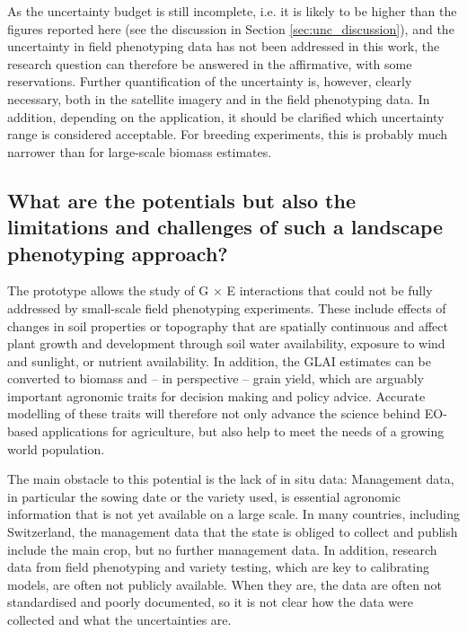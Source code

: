 As the uncertainty budget is still incomplete, i.e. it is likely to be higher than the figures reported here (see the discussion in Section \ref{sec:unc_discussion}), and the uncertainty in field phenotyping data has not been addressed in this work, the research question can therefore be answered in the affirmative, with some reservations. Further quantification of the uncertainty is, however, clearly necessary, both in the satellite imagery and in the field phenotyping data. In addition, depending on the application, it should be clarified which uncertainty range is considered acceptable. For breeding experiments, this is probably much narrower than for large-scale biomass estimates.

\subsection{What are the potentials but also the limitations and challenges of such a landscape phenotyping approach?}

The prototype allows the study of G $\times$ E interactions that could not be fully addressed by small-scale field phenotyping experiments. These include effects of changes in soil properties or topography that are spatially continuous and affect plant growth and development through soil water availability, exposure to wind and sunlight, or nutrient availability. In addition, the \gls{GLAI} estimates can be converted to biomass \citep{aase_relationship_1978} and -- in perspective -- grain yield, which are arguably important agronomic traits for decision making and policy advice. Accurate modelling of these traits will therefore not only advance the science behind \gls{EO}-based applications for agriculture, but also help to meet the needs of a growing world population.

The main obstacle to this potential is the lack of in situ data: Management data, in particular the sowing date or the variety used, is essential agronomic information that is not yet available on a large scale. In many countries, including Switzerland, the management data that the state is obliged to collect and publish include the main crop, but no further management data. In addition, research data from field phenotyping and variety testing, which are key to calibrating models, are often not publicly available. When they are, the data are often not standardised and poorly documented, so it is not clear how the data were collected and what the uncertainties are.

